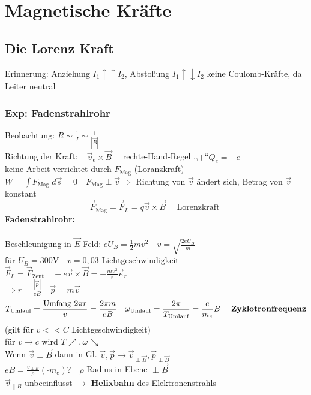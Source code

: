 \documentclass[titlepage,12pt,a4paper,ngerman]{report}
\newcommand{\tx}[1]{\textrm{#1}}
\begin{document}
\section{Magnetische Kräfte}
\subsection{Die Lorenz Kraft}
Erinnerung: Anziehung $  I_1 \uparrow \uparrow I_2 $, Abstoßung $ I_1 \uparrow \downarrow I_2 $ keine Coulomb-Kräfte, da Leiter neutral
\subsubsection{Exp: Fadenstrahlrohr}
Beobachtung: $  R \sim \frac{1}{I} \sim \frac{1}{|\vec{B}|} $\\
Richtung der Kraft: $ -\vec{v}_e \times \vec{B} \quad $ rechte-Hand-Regel ,,$ + $``$ Q_e = -e $\\[10pt]
keine Arbeit verrichtet durch $ F_{\tx{Mag}}  $ (Loranzkraft) $ W = \int F_{\tx{Mag}} \; d\vec{s} = 0\quad F_{\tx{Mag}} \perp \vec{v} \Rightarrow $ Richtung von $ \vec{v} $ ändert sich, Betrag von $ \vec{v} $ konstant
$$\boxed{\vec{F}_{\tx{Mag}} = \vec{F}_L = q \vec{v} \times \vec{B}} \quad \tx{ Lorenzkraft }$$
\textbf{Fadenstrahlrohr:}\\
\\Beschleunigung in $ \vec{E} $-Feld: $ eU_B = \frac{1}{2} m v^2 \quad v = \sqrt{\frac{2 e U _B}{m}} $\\
für $ U_B = 300 \tx{V} \quad v = 0,03 \tx{ Lichtgeschwindigkeit } $\\
$ \vec{F}_L  = \vec{F} _{\tx{Zent}} \quad -e \vec{v} \times \vec{B} = - \frac{mv^2}{r} \vec{e}_r$\\
$ \Rightarrow r = \frac{|\vec{p}|}{e B } \quad \vec{p} = m \vec{v} $\\
$$ T_{\tx{Umlauf}} = \frac{\tx{Umfang } 2 \pi r }{v} = \frac{ 2\pi m}{e B} \quad \omega _{\tx{Umlauf}} = \frac{2\pi }{T _{\tx{Umlauf}}} = \frac{e}{m_e} B \quad \tx{ \textbf{Zyklotronfrequenz}} $$
(gilt für $  v<<C $ Lichtgeschwindigkeit)\\
für $ v \rightarrow c $ wird $ T \nearrow , \omega \searrow $\\[5pt]
Wenn $ \vec{v} \perp \vec{B} $  dann in Gl. $ \vec{v},\vec{p} \rightarrow \vec{v}_{\perp \vec{B}}, \vec{p}_{\perp \vec{B}} $\\
$ eB = \frac{v_{\perp B}}{\rho} (\cdot m_e)? \quad \rho $ Radius in Ebene $ \perp \vec{B} $\\
$ \vec{v}_{\parallel B} $ unbeeinflusst $ \rightarrow $ \textbf{Helixbahn} des Elektronenstrahls\\
\end{document}
